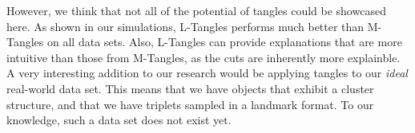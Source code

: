 However, we think that not all of the potential of tangles could be showcased here. 
As shown in our simulations, L-Tangles performs much better than M-Tangles on all data sets.
Also, L-Tangles can provide explanations that are more intuitive than those from M-Tangles,
as the cuts are inherently more explainble. A very interesting addition to our research would 
be applying tangles to our \textit{ideal} real-world data set. This means that we have objects
that exhibit a cluster structure, and that we have triplets sampled in a landmark format.
To our knowledge, such a data set does not exist yet.

